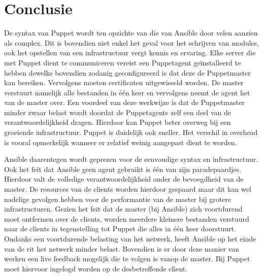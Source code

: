 
\chapter{Conclusie}
\label{ch:conclusie}

 De syntax van Puppet  wordt ten opzichte van die van Ansible door velen aanzien als complex. Dit is bovendien niet enkel het geval voor het schrijven van modules, ook het opstellen van een infrastructuur vergt kennis en ervaring. Elke server die met Puppet dient te communiceren vereist een Puppetagent ge\"installeerd te hebben dewelke bovendien zodanig geconfigureerd is dat deze de Puppetmaster kan bereiken. Vervolgens moeten certificaten uitgewisseld worden. De master verstuurt namelijk alle bestanden in \'e\'en keer en vervolgens neemt de agent het van de master over. Een voordeel van deze werkwijze is dat de Puppetmaster minder zwaar belast wordt doordat de Puppetagents zelf een deel van de verantwoordelijkheid dragen. Hierdoor kan Puppet beter overweg bij een groeiende infrastructuur. Puppet is duidelijk ook sneller. Het verschil in overhead is vooral opmerkelijk wanneer er relatief weinig aangepast dient te worden. 

Ansible daarentegen wordt geprezen voor de eenvoudige syntax en infrastructuur. Ook het feit dat Ansible geen agent gebruikt is \'e\'en van zijn paradepaardjes. Hierdoor valt de volledige verantwoordelijkheid onder de bevoegdheid van de master. De resources van de clients worden hierdoor gespaard maar dit kan wel nadelige gevolgen hebben voor de performantie van de master bij grotere infrastructuren. Gezien het feit dat de master (bij Ansible) zich voortdurend moet ontfermen over de clients, worden meerdere kleinere bestanden verstuurd naar de clients in tegenstelling tot Puppet die alles in \'e\'en keer doorstuurt. Ondanks een voortdurende belasting van het netwerk, heeft Ansible op het einde van de rit het netwerk minder belast. Bovendien is er door deze manier van werken een live feedback mogelijk die te volgen is vanop de master. Bij Puppet moet hiervoor ingelogd worden op de desbetreffende client.





